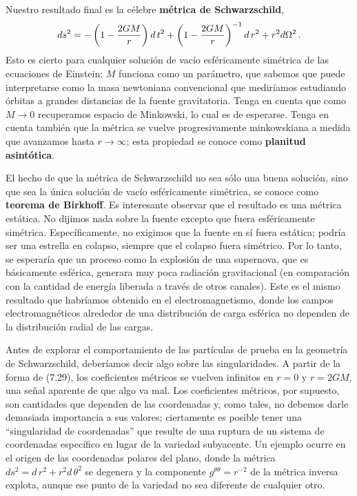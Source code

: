 \documentclass[11pt,b5paper,openany,twoside]{book}
\begin{document}
Nuestro resultado final es la célebre {\bf métrica de Schwarzschild},
\begin{equation}
ds^2 = -\left(1-{{2GM}\over r}\right) d\,t^2 +
\left(1-{{2GM}\over r}\right)^{-1} d\,r^2
+ r^2 d\Omega^2\,.\label{7.29}
\end{equation}
Esto es cierto para cualquier solución de vacío esféricamente simétrica de las ecuaciones de Einstein; $M$ funciona como un parámetro, que sabemos que puede interpretarse como la masa newtoniana convencional que mediríamos estudiando órbitas a grandes distancias de la fuente gravitatoria.
Tenga en cuenta que como $M\rightarrow 0$ recuperamos espacio de Minkowski, lo cual es de esperarse.
Tenga en cuenta también que la métrica se vuelve progresivamente minkowskiana a medida que avanzamos hasta $r\rightarrow\infty$; esta propiedad se conoce como {\bf planitud asintótica}.

El hecho de que la métrica de Schwarzschild no sea sólo una buena solución, sino que sea la única solución de vacío esféricamente simétrica, se conoce como {\bf teorema de Birkhoff}.
Es interesante observar que el resultado es una métrica estática.
No dijimos nada sobre la fuente excepto que fuera esféricamente simétrica.
Específicamente, no exigimos que la fuente en sí fuera estática; podría ser una estrella en colapso, siempre que el colapso fuera simétrico.
Por lo tanto, se esperaría que un proceso como la explosión de una supernova, que es básicamente esférica, generara muy poca radiación gravitacional (en comparación con la cantidad de energía liberada a través de otros canales).
Este es el mismo resultado que habríamos obtenido en el electromagnetismo, donde los campos electromagnéticos alrededor de una distribución de carga esférica no dependen de la distribución radial de las cargas.

Antes de explorar el comportamiento de las partículas de prueba en la geometría de Schwarzschild, deberíamos decir algo sobre las singularidades.
A partir de la forma de (7.29), los coeficientes métricos se vuelven infinitos en $r=0$ y $r=2GM$, una señal aparente de que algo va mal.
Los coeficientes métricos, por supuesto, son cantidades que dependen de las coordenadas y, como tales, no debemos darle demasiada importancia a sus valores; ciertamente es posible tener una ``singularidad de coordenadas'' que resulte de una ruptura de un sistema de coordenadas específico en lugar de la variedad subyacente.
Un ejemplo ocurre en el origen de las coordenadas polares del plano, donde la métrica $ds^2 =  d\,r^2 + r^2  d\,\theta^2$ se degenera y la componente $g^{\theta\theta}=r^{-2}$ de la métrica inversa explota, aunque ese punto de la variedad no sea diferente de cualquier otro.
\end{document}
